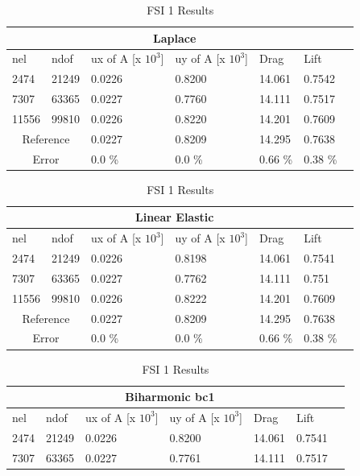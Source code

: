 \begin{table}[h!]
\centering
\caption{FSI 1 Results}
\label{FSI-1 Results}
\begin{tabular}{ |p{1cm}||p{1cm}|p{2.5cm}|p{2.5cm}|p{2.7cm}|p{2.7cm}|p{1.2cm}|}
 \hline
  \multicolumn{6}{|c|}{Laplace} \\
   \hline
nel & ndof & ux of A [x $10^{3}$]  &uy of A [x $10^{3}$]& Drag  & Lift \\
 \hline
 2474    & 21249  &       0.0226 &       0.8200 & 14.061 & 0.7542 \\
 7307    & 63365  &       0.0227 &       0.7760 & 14.111 & 0.7517 \\
 11556   & 99810  &       0.0226 &      0.8220 & 14.201 & 0.7609 \\
  \hline
 \multicolumn{2}{|c|}{Reference} &  0.0227      &       0.8209      & 14.295  & 0.7638   \\
 \hline
     \multicolumn{2}{|c|}{Error}  &0.0 \% & 0.0 \% & 0.66 \% & 0.38 \% \\
   \hline
\end{tabular}
\begin{tabular}{ |p{1cm}||p{1cm}|p{2.5cm}|p{2.5cm}|p{2.7cm}|p{2.7cm}|p{1.2cm}|}
 \hline
  \multicolumn{6}{|c|}{Linear Elastic} \\
   \hline
nel & ndof & ux of A [x $10^{3}$]  &uy of A [x $10^{3}$]& Drag  & Lift \\
 \hline
 2474    & 21249  &       0.0226 &       0.8198 & 14.061 & 0.7541 \\
 7307    & 63365  &       0.0227 &       0.7762 & 14.111 & 0.751  \\
 11556   & 99810  &       0.0226  &       0.8222 & 14.201 & 0.7609 \\
  \hline
 \multicolumn{2}{|c|}{Reference} &  0.0227      &       0.8209      & 14.295  & 0.7638   \\
 \hline
    \multicolumn{2}{|c|}{Error}  &0.0 \% & 0.0 \% & 0.66 \% & 0.38 \% \\
 \hline
\end{tabular}
\begin{tabular}{ |p{1cm}||p{1cm}|p{2.5cm}|p{2.5cm}|p{2.7cm}|p{2.7cm}|p{1.2cm}|}
 \hline
  \multicolumn{6}{|c|}{Biharmonic bc1} \\
   \hline
nel & ndof & ux of A [x $10^{3}$]  &uy of A [x $10^{3}$]& Drag  & Lift \\
 \hline
 2474    & 21249  &       0.0226 &       0.8200 & 14.061 & 0.7541 \\
 7307    & 63365  &       0.0227  &       0.7761 & 14.111 & 0.7517 \\

\end{tabular}
\end{table}
